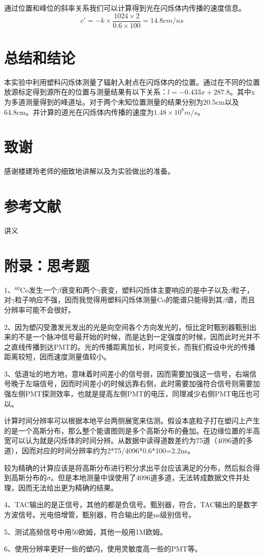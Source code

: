 \documentclass[a4paper,10.0pt,twoside]{npr}
\begin{document}
\begin{multicols}{2}
通过位置和峰位的斜率关系我们可以计算得到光在闪烁体内传播的速度信息。
\begin{equation}
	c'=-k\times\frac{1024\times2}{0.6\times100}=14.8cm/ns
\end{equation}


\section{总结和结论}
本实验中利用塑料闪烁体测量了辐射入射点在闪烁体内的位置。通过在不同的位置放源标定得到源所在的位置与测量结果有以下关系：$l=-0.433x+287.8$。其中x为多道测量得到的峰道址。对于两个未知位置测量的结果分别为20.5cm以及64.8cm。并计算的道光在闪烁体内传播的速度为$1.48\times10^{8}m/s$。
\section{致谢}
感谢楼建玲老师的细致地讲解以及为实验做出的准备。
\section{参考文献}

\noindent
[1] 讲义
\end{multicols}

\newpage


\section*{附录：思考题}
1、$^{60}$Co发生一个$\beta$衰变和两个$\gamma$衰变，塑料闪烁体主要响应的是中子以及$\beta$粒子，对$\gamma$粒子响应不强，因而我觉得用塑料闪烁体测量Co的能谱只能得到其$\beta$谱，而且分辨率可能不会很好。

2、因为塑闪受激发光发出的光是向空间各个方向发光的，恒比定时甄别器甄别出来的不是一个脉冲信号最开始的时候，而是达到一定强度的时候，因而此时光并不之直线传播到达PMT的。光的传播距离加长，时间变长，而我们假设中光的传播距离较短，因而速度测量值较小。

3、低道址的地方地，意味着时间差小的信号弱，因而需要加强这一信号，右端信号晚于左端信号，因而时间差小的时候远靠右侧，此时需要加强符合信号则需要加强左侧PMT探测效率，也就是提高左侧PMT的电压，同理减少右侧PMT电压也可以。

计算时间分辨率可以根据本地平台两侧展宽来估测。假设本底粒子打在塑闪上产生的是一个高斯分布，那么整个能谱图则是多个高斯分布的叠加。在边缘位置的半高宽可以认为就是闪烁体的时间分辨。从数据中读得道数差约为75道（4096道的多道），因而对应的时间分辨率约为2*75/4096*0.6*100=2.2ns。 

较为精确的计算应该是将高斯分布进行积分求出平台应该满足的分布，然后拟合得到高斯分布的$\sigma$。但是本地测量中误使用了4096道多道，无法转成数据文件并处理，因而无法给出更为精确的结果。

4、TAC输出的是正信号，其他的都是负信号。甄别器，符合，TAC输出的是数字方波信号。光电倍增管，甄别器，符合输出的是ns级别信号。

5、测试高频信号中用50欧姆，其他一般用1M欧姆。

6、使用分辨率更好一些的塑闪，使用灵敏度高一些的PMT等。

\clearpage
\end{document}
